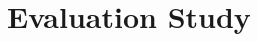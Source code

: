 \documentclass[manuscript,review,anonymous]{acmart}
\begin{document}







\section{Evaluation Study}
\label{sec:evaluation}
\label{sec:user-study}
\end{document}
